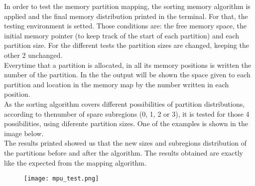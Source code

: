 %
%
In order to test the memory partition mapping,
the sorting memory algorithm is applied and the final memory distribution printed in the terminal.
For that, the testing environment is setted.
Those conditions are: the free memory space,
the initial memory pointer (to keep track of the start of each partition) and each partition size.
For the different tests the partition sizes are changed, keeping the other 2 unchanged.\\
Everytime that a partition is allocated,
in all its memory positions is written the number of the partition.
In the the output will be shown the space given to each partition and location
in the memory map by the number written in each position.\\
As the sorting algorithm covers different possibilities of partition distributions,
according to thenumber of spare subregions (0, 1, 2 or 3),
it is tested for those 4 possibilities, using diferente partition sizes.
One of the examples is shown in the image below.\\
The results printed showed us that the new sizes and subregions distribution of
the partitions before and after the algorithm. The results obtained are exactly
like the expected from the mapping algorithm.\\
\begin{figure}[H]
	\centering\texttt{[image: mpu\_test.png]}
	\label{fig:testing_mpu}
\end{figure}


